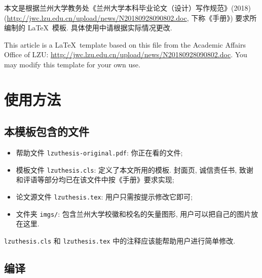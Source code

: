 \documentclass{lzuthesis}
\begin{document}
\makecover

\makeliability

\begin{cnabstract}
	本文是根据兰州大学教务处《兰州大学本科毕业论文（设计）写作规范》(2018)
	(\url{http://jwc.lzu.edu.cn/upload/news/N20180928090802.doc},
	下称《手册》) 要求所编制的 \LaTeX\ 模板. 具体使用中请根据实际情况更改.
\end{cnabstract}

\begin{enabstract}
	This article is a \LaTeX\ template based on this file from the Academic Affairs Office of LZU: \url{http://jwc.lzu.edu.cn/upload/news/N20180928090802.doc}. You may modify this template for your own use.
\end{enabstract}

\maketoc


\section{使用方法}

\subsection{本模板包含的文件}

\begin{itemize}
	\item 帮助文件 \texttt{lzuthesis-original.pdf}: 你正在看的文件;
	\item 模板文件 \texttt{lzuthesis.cls}: 定义了本文所用的模板.
	封面页, 诚信责任书, 致谢和评语等部分均已在该文件中按《手册》要求实现;
	\item 论文源文件 \texttt{lzuthesis.tex}: 用户只需按提示修改它即可;
	\item 文件夹 \texttt{imgs/}: 包含兰州大学校徽和校名的矢量图形,
		用户可以把自己的图片放在这里.
\end{itemize}
\texttt{lzuthesis.cls} 和 \texttt{lzuthesis.tex}
中的注释应该能帮助用户进行简单修改.

\subsection{编译}
\end{document}
